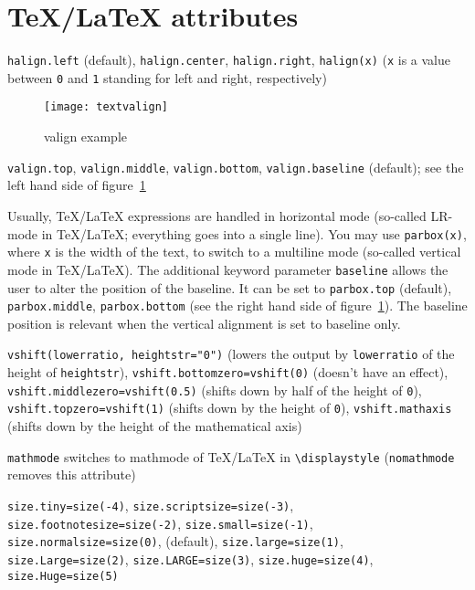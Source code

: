 \section[TeX/LaTeX attributes]{\TeX/\LaTeX{} attributes}

\begin{description}
\raggedright
\item[Horizontal alignment:] \verb|halign.left| (default),
\verb|halign.center|, \verb|halign.right|, \verb|halign(x)| (\verb|x|
is a value between \verb|0| and \verb|1| standing for left and right,
respectively)
\begin{figure}
\centerline{\texttt{[image: textvalign]}}
\caption{valign example}
\label{fig:textvalign}
\end{figure}
\item[Vertical alignment:] \verb|valign.top|, \verb|valign.middle|,
\verb|valign.bottom|, \verb|valign.baseline| (default); see the left
hand side of figure~\ref{fig:textvalign}
\item[Vertical box:] Usually, \TeX/\LaTeX{} expressions are handled in
horizontal mode (so-called LR-mode in \TeX/\LaTeX; everything goes
into a single line). You may use \verb|parbox(x)|, where \verb|x| is the
width of the text, to switch to a multiline mode (so-called vertical
mode in \TeX/\LaTeX). The additional keyword parameter \verb|baseline|
allows the user to alter the position of the baseline. It can be set
to \verb|parbox.top| (default), \verb|parbox.middle|,
\verb|parbox.bottom| (see the right hand side of
figure~\ref{fig:textvalign}). The baseline position is relevant when
the vertical alignment is set to baseline only.
\item[Vertical shift:] \verb|vshift(lowerratio, heightstr="0")|
(lowers the output by \verb|lowerratio| of the height of
\verb|heightstr|), \verb|vshift.bottomzero=vshift(0)| (doesn't have an
effect), \verb|vshift.middlezero=vshift(0.5)| (shifts down by half of
the height of \verb|0|), \verb|vshift.topzero=vshift(1)| (shifts down
by the height of \verb|0|), \verb|vshift.mathaxis| (shifts down by the
height of the mathematical axis)
\item[Mathmode:] \verb|mathmode| switches to mathmode of \TeX/\LaTeX{}
in \verb|\displaystyle| (\verb|nomathmode| removes this attribute)
\item[Font size:] \verb|size.tiny=size(-4)|,
\verb|size.scriptsize=size(-3)|, \verb|size.footnotesize=size(-2)|,
\verb|size.small=size(-1)|, \verb|size.normalsize=size(0)|,
(default), \verb|size.large=size(1)|, \verb|size.Large=size(2)|,
\verb|size.LARGE=size(3)|, \verb|size.huge=size(4)|,
\verb|size.Huge=size(5)|
\end{description}

